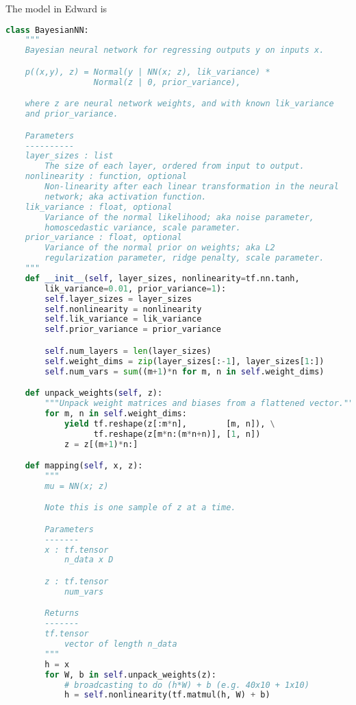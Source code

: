 The model in Edward is 
\begin{lstlisting}[language=Python]
class BayesianNN:
    """
    Bayesian neural network for regressing outputs y on inputs x.

    p((x,y), z) = Normal(y | NN(x; z), lik_variance) *
                  Normal(z | 0, prior_variance),

    where z are neural network weights, and with known lik_variance
    and prior_variance.

    Parameters
    ----------
    layer_sizes : list
        The size of each layer, ordered from input to output.
    nonlinearity : function, optional
        Non-linearity after each linear transformation in the neural
        network; aka activation function.
    lik_variance : float, optional
        Variance of the normal likelihood; aka noise parameter,
        homoscedastic variance, scale parameter.
    prior_variance : float, optional
        Variance of the normal prior on weights; aka L2
        regularization parameter, ridge penalty, scale parameter.
    """
    def __init__(self, layer_sizes, nonlinearity=tf.nn.tanh,
        lik_variance=0.01, prior_variance=1):
        self.layer_sizes = layer_sizes
        self.nonlinearity = nonlinearity
        self.lik_variance = lik_variance
        self.prior_variance = prior_variance

        self.num_layers = len(layer_sizes)
        self.weight_dims = zip(layer_sizes[:-1], layer_sizes[1:])
        self.num_vars = sum((m+1)*n for m, n in self.weight_dims)

    def unpack_weights(self, z):
        """Unpack weight matrices and biases from a flattened vector."""
        for m, n in self.weight_dims:
            yield tf.reshape(z[:m*n],        [m, n]), \
                  tf.reshape(z[m*n:(m*n+n)], [1, n])
            z = z[(m+1)*n:]

    def mapping(self, x, z):
        """
        mu = NN(x; z)

        Note this is one sample of z at a time.

        Parameters
        -------
        x : tf.tensor
            n_data x D

        z : tf.tensor
            num_vars

        Returns
        -------
        tf.tensor
            vector of length n_data
        """
        h = x
        for W, b in self.unpack_weights(z):
            # broadcasting to do (h*W) + b (e.g. 40x10 + 1x10)
            h = self.nonlinearity(tf.matmul(h, W) + b)


\end{lstlisting}
